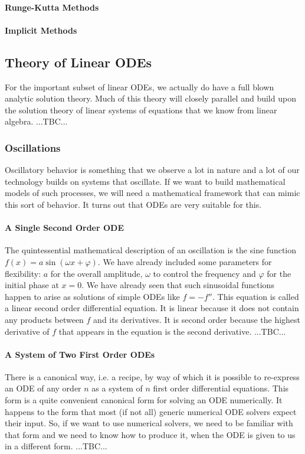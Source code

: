 \paragraph{Runge-Kutta Methods}

\paragraph{Implicit Methods}



\subsection{Theory of Linear ODEs}
For the important subset of linear ODEs, we actually do have a full blown analytic solution theory. Much of this theory will closely parallel and build upon the solution theory of linear systems of equations that we know from linear algebra. ...TBC...


\subsubsection{Oscillations}
Oscillatory behavior is something that we observe a lot in nature and a lot of our technology builds on systems that oscillate. If we want to build mathematical models of such processes, we will need a mathematical framework that can mimic this sort of behavior. It turns out that ODEs are very suitable for this.

\paragraph{A Single Second Order ODE}
The quintessential mathematical description of an oscillation is the sine function $f(x) = a \sin(\omega x + \varphi)$. We have already included some parameters for flexibility: $a$ for the overall amplitude, $\omega$ to control the frequency and $\varphi$ for the initial phase at $x=0$. We have already seen that such sinusoidal functions happen to arise as solutions of simple ODEs like $f = -f''$. This equation is called a linear second order differential equation. It is linear because it does not contain any products between $f$ and its derivatives. It is second order because the highest derivative of $f$ that appears in the equation is the second derivative. ...TBC...

\paragraph{A System of Two First Order ODEs}
There is a canonical way, i.e. a recipe, by way of which it is possible to re-express an ODE of any order $n$ as a system of $n$ first order differential equations. This form is a quite convenient canonical form for solving an ODE numerically. It happens to the form that most (if not all) generic numerical ODE solvers expect their input. So, if we want to use numerical solvers, we need to be familiar with that form and we need to know how to produce it, when the ODE is given to us in a different form.
...TBC...


